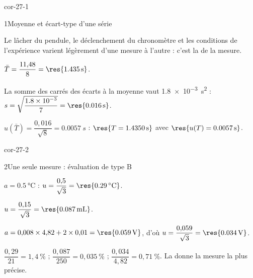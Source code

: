 \corrigesSouples

\begin{blocLivre}{cor-27-1}
\begin{corrige}{1}{Moyenne et écart-type d'une série}
\begin{questions}
\item Le lâcher du pendule, le déclenchement du chronomètre et les conditions de l'expérience varient légèrement d'une
mesure à l'autre : c'est la  de la mesure.
\item $\bar T=\dfrac{11{,}48}{8}=\res{\qty{1,435}{s}}$.
\item La somme des carrés des écarts à la moyenne vaut \qty{1,8e-3}{s^2} : $s=\sqrt{\dfrac{\num{1.8e-3}}{7}}=\res{\qty{0,016}{s}}$.
\item $u(\bar T)=\dfrac{0{,}016}{\sqrt8}=\qty{0,0057}{s}$ : $\res{T=\qty{1,4350}{s}}$ avec $\res{u(T)=\qty{0,0057}{s}}$.
\end{questions}
\end{corrige}
\end{blocLivre}
\begin{blocLivre}{cor-27-2}
\begin{corrige}{2}{Une seule mesure : évaluation de type B}
\begin{questions}
\item $a=\qty{0,5}{\degreeCelsius}$ : $u=\dfrac{0{,}5}{\sqrt3}=\res{\qty{0,29}{\degreeCelsius}}$.
\item $u=\dfrac{0{,}15}{\sqrt3}=\res{\qty{0,087}{mL}}$.
\item $a=0{,}008\times4{,}82+2\times0{,}01=\res{\qty{0,059}{V}}$, d'où $u=\dfrac{0{,}059}{\sqrt3}=\res{\qty{0,034}{V}}$.
\item $\dfrac{0{,}29}{21}=1{,}4~\%$ ; $\dfrac{0{,}087}{250}=0{,}035~\%$ ; $\dfrac{0{,}034}{4{,}82}=0{,}71~\%$. La  donne la mesure la
plus précise.
\end{questions}
\end{corrige}
\end{blocLivre}
